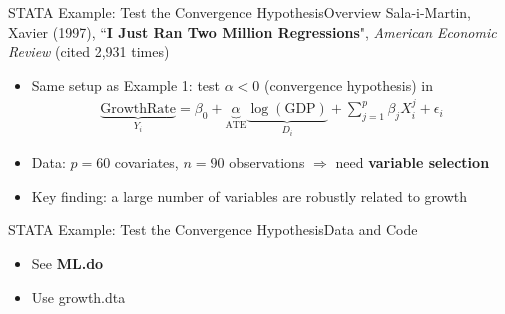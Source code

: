 \documentclass[dvipsnames,hyperref={pdfpagelabels=false}]{beamer}
\begin{document}





\date
{}


\begin{frame}{}
	\titlepage
\end{frame}




\begin{frame}{STATA Example: Test the Convergence Hypothesis}{Overview}
	Sala-i-Martin, Xavier (1997), ``\textbf{I Just Ran Two Million Regressions}", \textit{American Economic Review} (cited 2,931 times)
	\vspace{0.3cm}
	\begin{itemize}
		\item Same setup as Example 1: test $\alpha < 0$ (convergence hypothesis) in
		\begin{eqnarray*}
			\underbrace{\mbox{GrowthRate}}_{Y_{i}} = \beta_{0} + \underbrace{\alpha}_{\mbox{ATE}} \underbrace{\log(\mbox{GDP})}_{D_{i}} + \sum^{p}_{j=1} \beta_{j} X^{j}_{i} + \epsilon_{i}
		\end{eqnarray*}
		\item Data: $p = 60$ covariates, $n = 90$ observations $\Rightarrow$ need \textbf{variable selection}
		\vspace{0.2cm}
		\item Key finding: a large number of variables are robustly related to growth
	\end{itemize}
\end{frame}



\begin{frame}[fragile]{STATA Example: Test the Convergence Hypothesis}{Data and Code}
	\begin{itemize}
	   \item See \textbf{ML.do}
		\vspace{0.2cm}
		\item Use growth.dta
		\vspace{0.2cm}
		
	\end{itemize}
\end{frame}
\end{document}
